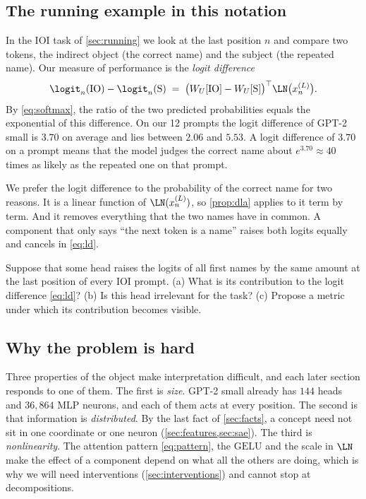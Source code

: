 \subsection{The running example in this notation}
\label{sec:metric}

In the IOI task of \cref{sec:running} we look at the last position $n$ and compare two tokens, the indirect object
(the correct name) and the subject (the repeated name). Our measure of performance is the \emph{logit difference}
\begin{equation}\label{eq:ld}
\logit_n(\mathrm{IO})-\logit_n(\mathrm{S}) \;=\; \big(W_U[\mathrm{IO}]-W_U[\mathrm{S}]\big)^\top\LN\big(x_n^{(L)}\big).
\end{equation}
By \eqref{eq:softmax}, the ratio of the two predicted probabilities equals the exponential of this difference.
On our 12 prompts the logit difference of GPT-2 small is $3.70$ on average and lies between $2.06$ and $5.53$.
A logit difference of $3.70$ on a prompt means that the model judges the correct name about
$e^{3.70}\approx 40$ times as likely as the repeated one on that prompt.

We prefer the logit difference to the probability of the correct name for two reasons. It is a linear function of
$\LN(x_n^{(L)})$, so \cref{prop:dla} applies to it term by term. And it removes everything that the two names have
in common. A component that only says ``the next token is a name'' raises both logits equally and cancels in
\eqref{eq:ld}.

\begin{exercise}\label{ex:metric}
Suppose that some head raises the logits of all first names by the same amount at the last position of every IOI
prompt. (a) What is its contribution to the logit difference \eqref{eq:ld}? (b) Is this head irrelevant for the
task? (c) Propose a metric under which its contribution becomes visible.
\end{exercise}

\subsection{Why the problem is hard}

Three properties of the object make interpretation difficult, and each later section responds to one of them.
The first is \emph{size}. GPT-2 small already has $144$ heads and $36{,}864$ MLP neurons, and each of them acts
at every position. The second is that information is \emph{distributed}. By the last fact of \cref{sec:facts},
a concept need not sit in one coordinate or one neuron (\cref{sec:features,sec:sae}). The third is
\emph{nonlinearity}. The attention pattern \eqref{eq:pattern}, the $\mathrm{GELU}$ and the scale in $\LN$ make
the effect of a component depend on what all the others are doing, which is why we will need interventions
(\cref{sec:interventions}) and cannot stop at decompositions.

